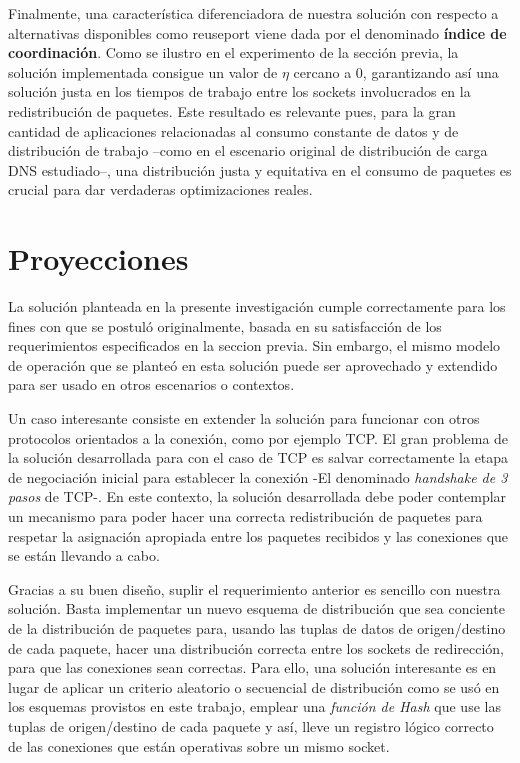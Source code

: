Finalmente, una característica diferenciadora de nuestra solución con respecto a alternativas disponibles como reuseport viene dada por el denominado \textbf{índice de coordinación}. Como se ilustro en el experimento de la sección previa, la solución implementada consigue un valor de $\eta$ cercano a 0, garantizando así una solución justa en los tiempos de trabajo entre los sockets involucrados en la redistribución de paquetes. Este resultado es relevante pues, para la gran cantidad de aplicaciones relacionadas al consumo constante de datos y de distribución de trabajo –como en el escenario original de distribución de carga DNS estudiado--, una distribución justa y equitativa en el consumo de paquetes es crucial para dar verdaderas optimizaciones reales.

\section{Proyecciones}
La solución planteada en la presente investigación cumple correctamente para los fines con que se postuló originalmente, basada en su satisfacción de los requerimientos especificados en la seccion previa. Sin embargo, el mismo modelo de operación que se planteó en esta solución puede ser aprovechado y extendido para ser usado en otros escenarios o contextos.

Un caso interesante consiste en extender la solución para funcionar con otros protocolos orientados a la conexión, como por ejemplo TCP. El gran problema de la solución desarrollada para con el caso de TCP es salvar correctamente la etapa de negociación inicial para establecer la conexión -El denominado \emph{handshake de 3 pasos} de TCP-. En este contexto, la solución desarrollada debe poder contemplar un mecanismo para poder hacer una correcta redistribución de paquetes para respetar la asignación apropiada entre los paquetes recibidos y las conexiones que se están llevando a cabo.

Gracias a su buen diseño, suplir el requerimiento anterior es sencillo con nuestra solución. Basta implementar un nuevo esquema de distribución que sea conciente de la distribución de paquetes para, usando las tuplas de datos de origen/destino de cada paquete, hacer una distribución correcta entre los sockets de redirección, para que las conexiones sean correctas. Para ello, una solución interesante es en lugar de aplicar un criterio aleatorio o secuencial de distribución como se usó en los esquemas provistos en este trabajo, emplear una \emph{función de Hash} que use las tuplas de origen/destino de cada paquete y así, lleve un registro lógico correcto de las conexiones que están operativas sobre un mismo socket.

